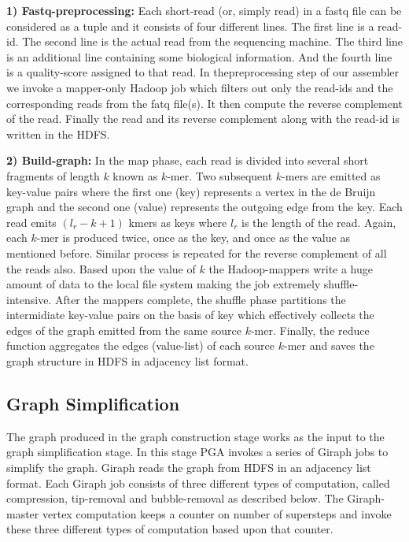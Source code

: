 \documentclass[conference]{IEEEtran}
\begin{document}
\textbf{1) Fastq-preprocessing:} Each short-read (or, simply read) in a fastq file can be considered as a tuple and it consists of four different lines. The first line is a read-id. The second line is the actual read from the sequencing machine. The third line is an additional line containing some biological information. And the fourth line is a quality-score assigned to that read. 
In thepreprocessing step of our assembler we invoke a mapper-only Hadoop job which filters out only the read-ids and the corresponding reads from the fatq file(s). It then compute the reverse complement of the read. Finally the read and its reverse complement along with the read-id is written in the HDFS.

\textbf{2) Build-graph:} 
In the map phase, each read is divided into several short fragments of length $k$ known as $k$-mer.
Two subsequent $k$-mers are emitted as key-value pairs where the first one (key) represents a vertex in the de Bruijn graph and the second one (value) represents the outgoing edge from the key. 
Each read emits $(l_r-k+1)$ kmers as keys where $l_r$ is the length of the read.
Again, each $k$-mer is produced twice, once as the key, and once as the value as mentioned before.
Similar process is repeated for the reverse complement of all the reads also.
Based upon the value of $k$ the Hadoop-mappers write a huge amount of data to the local file system making the job extremely shuffle-intensive. 
After the mappers complete, the shuffle phase partitions the intermidiate key-value pairs on the basis of key which effectively collects the edges of the graph emitted from the same source $k$-mer.
Finally, the reduce function aggregates the edges (value-list) of each source $k$-mer and saves the graph structure in HDFS in adjacency list format.

\subsection {Graph Simplification}
The graph produced in the graph construction stage works as the input to the graph simplification stage.
In this stage PGA invokes a series of Giraph jobs to simplify the graph.
Giraph reads the graph from HDFS in an adjacency list format.
Each Giraph job consists of three different types of computation, called compression, tip-removal and bubble-removal as described below.
The Giraph-master vertex computation keeps a counter on number of supersteps and invoke these three different types of computation based upon that counter.
 
\end{document}

